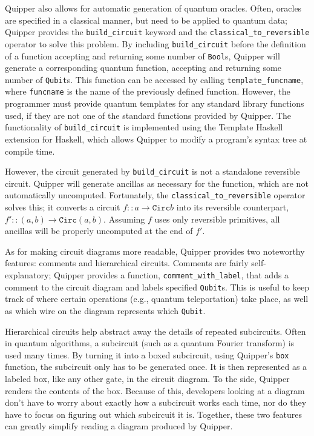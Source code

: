 \documentclass[]{article}
\begin{document}
Quipper also allows for automatic generation of quantum oracles. Often, oracles are specified in a classical manner, but need to be applied to quantum data; Quipper provides the \verb|build_circuit| keyword and the \verb|classical_to_reversible| operator to solve this problem. By including \verb|build_circuit| before the definition of a function accepting and returning some number of \texttt{Bool}s, Quipper will generate a corresponding quantum function, accepting and returning some number of \texttt{Qubit}s. This function can be accessed by calling \verb|template_funcname|, where \texttt{funcname} is the name of the previously defined function. However, the programmer must provide quantum templates for any standard library functions used, if they are not one of the standard functions provided by Quipper. The functionality of \verb|build_circuit| is implemented using the Template Haskell extension for Haskell, which allows Quipper to modify a program's syntax tree at compile time.

However, the circuit generated by \verb|build_circuit| is not a standalone reversible circuit. Quipper will generate ancillas as necessary for the function, which are not automatically uncomputed. Fortunately, the \verb|classical_to_reversible| operator solves this; it converts a circuit $f :: a \to \texttt{Circ} b$ into its reversible counterpart, $f' :: (a, b) \to \texttt{Circ} (a, b)$. Assuming $f$ uses only reversible primitives, all ancillas will be properly uncomputed at the end of $f'$.

As for making circuit diagrams more readable, Quipper provides two noteworthy features: comments and hierarchical circuits. Comments are fairly self-explanatory; Quipper provides a function, \verb|comment_with_label|, that adds a comment to the circuit diagram and labels specified \texttt{Qubit}s. This is useful to keep track of where certain operations (e.g., quantum teleportation) take place, as well as which wire on the diagram represents which \texttt{Qubit}.

Hierarchical circuits help abstract away the details of repeated subcircuits. Often in quantum algorithms, a subcircuit (such as a quantum Fourier transform) is used many times. By turning it into a boxed subcircuit, using Quipper's \texttt{box} function, the subcircuit only has to be generated once. It is then represented as a labeled box, like any other gate, in the circuit diagram. To the side, Quipper renders the contents of the box. Because of this, developers looking at a diagram don't have to worry about exactly how a subcircuit works each time, nor do they have to focus on figuring out which subcircuit it is. Together, these two features can greatly simplify reading a diagram produced by Quipper.
\end{document}
